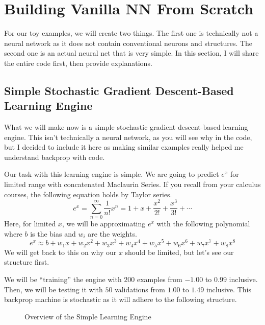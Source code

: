 \documentclass[../../../main.tex]{subfiles}
\begin{document}
\section{Building Vanilla NN From Scratch}

For our toy examples, we will create two things. The first one is
technically not a neural network as it does not contain conventional
neurons and structures. The second one is an actual neural net that
is very simple. In this section, I will share the entire code first,
then provide explanations.

\subsection{Simple Stochastic Gradient Descent-Based
\texorpdfstring{\\}{ } Learning Engine}

What we will make now is a simple stochastic gradient descent-based
learning engine. This isn't technically a neural network, as you will
see why in the code, but I decided to include it here as making
similar examples really helped me understand backprop with code.

Our task with this learning engine is simple. We are going to predict
$e^x$ for limited range with concatenated Maclaurin Series.
If you recall from your calculus courses, the following equation holds
by Taylor series.
\[
e^x
= \sum_{n = 0}^\infty \frac{1}{n!} x^n
= 1 + x + \frac{x^2}{2!} + \frac{x^3}{3!} + \cdots
\]
Here, for limited $x$, we will be approximating $e^x$ with the
following polynomial where $b$ is the bias and $w_i$ are the
weights.
\[
e^x
\approx b + w_1x + w_2x^2 + w_3x^3 + w_4x^4 + w_5x^5 + w_6x^6
    + w_7x^7 + w_8x^8
\]
We will get back to this on why our $x$ should be limited, but let's
see our structure first.

We will be ``training'' the engine with $200$ examples from $-1.00$ to
$0.99$ inclusive. Then, we will be testing it with $50$ validations
from $1.00$ to $1.49$ inclusive. This backprop machine is stochastic
as it will adhere to the following structure.

\begin{figure}[H]
\centering
{}
\caption{Overview of the Simple Learning Engine}
\end{figure}
\end{document}
